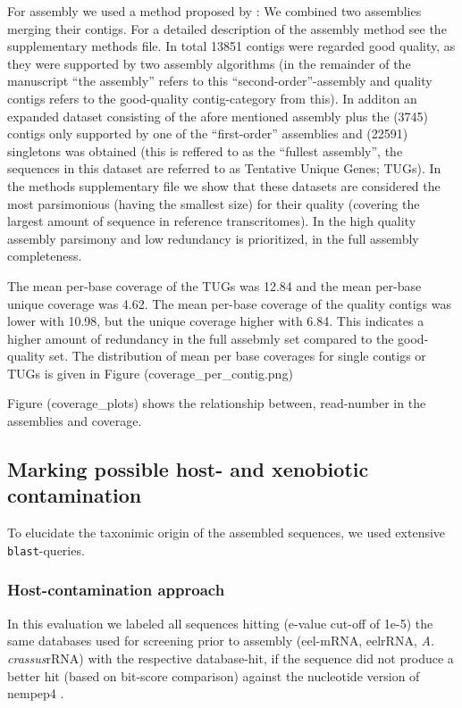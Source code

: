 \documentclass[10pt]{bmc_article}
\newenvironment{bmcformat}{\begin{raggedright}\baselineskip20pt\sloppy\setboolean{publ}{false}}{\end{raggedright}\baselineskip20pt\sloppy}
\begin{document}
\begin{bmcformat}
For assembly we used a method proposed by \cite{pmid20950480}: We
combined two assemblies merging their contigs. For a detailed
description of the assembly method see the supplementary methods
file. In total 13851 contigs were regarded good quality, as they
were supported by two assembly algorithms (in the remainder of the
manuscript ``the assembly'' refers to this ``second-order''-assembly
and quality contigs refers to the good-quality contig-category from
this). In additon an expanded dataset consisting of the afore
mentioned assembly plus the (3745) contigs only supported by
one of the ``first-order'' assemblies and (22591) singletons
was obtained (this is reffered to as the ``fullest assembly'', the
sequences in this dataset are referred to as Tentative Unique Genes;
TUGs). In the methods supplementary file we show that these datasets
are considered the most parsimonious (having the smallest size) for
their quality (covering the largest amount of sequence in reference
transcritomes). In the high quality assembly parsimony and low
redundancy is prioritized, in the full assembly completeness.


The mean per-base coverage of the TUGs was 12.84 and the mean
per-base unique coverage was 4.62. The mean per-base coverage
of the quality contigs was lower with 10.98, but the unique
coverage higher with 6.84. This indicates a higher amount
of redundancy in the full assebmly set compared to the good-quality
set. The distribution of mean per base coverages for single contigs or
TUGs is given in Figure (coverage\_per\_contig.png)

Figure (coverage\_plots) shows the relationship between, read-number
in the assemblies and coverage.

\subsection*{Marking possible host- and xenobiotic contamination}



To elucidate the taxonimic origin of the assembled sequences, we used
extensive \texttt{blast}-queries.

\subsubsection*{Host-contamination approach}

In this evaluation we labeled all sequences hitting (e-value
cut-off of 1e-5) the same databases used for screening prior to
assembly (eel-mRNA, eelrRNA, \textit{A. crassus}rRNA) with the
respective database-hit, if the sequence did not produce a better hit
(based on bit-score comparison) against the nucleotide version of
nempep4 \cite{pmid21550347}.  


\end{bmcformat}
\end{document}
